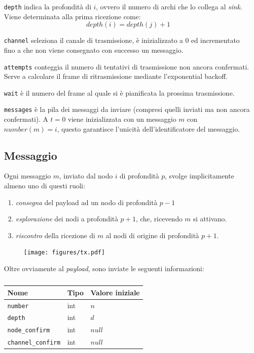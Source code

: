 \documentclass[a4paper,12pt]{article}
\theoremstyle{definition}
\begin{document}
\texttt{depth} indica la profondità di $i$, ovvero il numero di archi che lo collega al \emph{sink}. Viene determinata alla prima ricezione come:
\begin{equation*}
depth(i) = depth(j) + 1
\end{equation*}

\texttt{channel} seleziona il canale di trasmissione, è inizializzato a $0$ ed incrementato fino a che non viene consegnato con successo un messaggio.

\texttt{attempts} conteggia il numero di tentativi di trasmissione non ancora confermati. Serve a calcolare il frame di ritrasmissione mediante l'exponential backoff.

\texttt{wait} è il numero del frame al quale si è pianificata la prossima trasmissione.

\texttt{messages} è la pila dei messaggi da inviare (compresi quelli inviati ma non ancora confermati). A $t=0$ viene inizializzata con un messaggio $m$ con $number(m) = i$, questo garantisce l'unicità dell'identificatore del messaggio.

\subsection{Messaggio}

Ogni messaggio $m$, inviato dal nodo $i$ di profondità $p$, svolge implicitamente almeno uno di questi ruoli:

\begin{enumerate}
\item \emph{consegna} del payload ad un nodo di profondità $p-1$
\item \emph{esplorazione} dei nodi a profondità $p+1$, che, ricevendo $m$ si attivano.
\item \emph{riscontro} della ricezione di $m$ al nodi di origine di profondità $p+1$.
\end{enumerate}

\begin{figure}[H]
\centering
\texttt{[image: figures/tx.pdf]}
\caption{}
\end{figure}

Oltre ovviamente al \emph{payload}, sono inviate le seguenti informazioni:

\begin{table}[H]
\centering
\begin{tabular}{| l | l | l |}
\multicolumn{1}{l}{Nome} &
\multicolumn{1}{l}{Tipo} &
\multicolumn{1}{l}{Valore iniziale} \\ \hline
\texttt{number} & int & $n$ \\ \hline
\texttt{depth} & int & $d$ \\ \hline
\texttt{node\_confirm} & int & $null$ \\ \hline
\texttt{channel\_confirm} & int & $null$ \\ \hline
\end{tabular}
\caption{}
\end{table}
\end{document}

